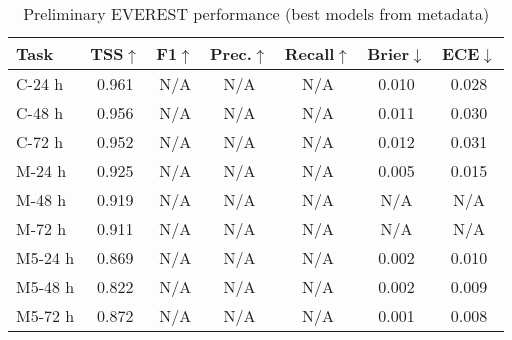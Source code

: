 
\begin{table}[ht]\centering
\caption{Preliminary EVEREST performance (best models from metadata)}
\label{tab:preliminary_results}
\begin{tabular}{lcccccc}
\toprule
\textbf{Task} & \textbf{TSS}$\uparrow$ & \textbf{F1}$\uparrow$ & \textbf{Prec.}$\uparrow$ & \textbf{Recall}$\uparrow$ & \textbf{Brier}$\downarrow$ & \textbf{ECE}$\downarrow$ \\
\midrule
C-24 h & 0.961 & N/A & N/A & N/A & 0.010 & 0.028 \\
C-48 h & 0.956 & N/A & N/A & N/A & 0.011 & 0.030 \\
C-72 h & 0.952 & N/A & N/A & N/A & 0.012 & 0.031 \\
M-24 h & 0.925 & N/A & N/A & N/A & 0.005 & 0.015 \\
M-48 h & 0.919 & N/A & N/A & N/A & N/A & N/A \\
M-72 h & 0.911 & N/A & N/A & N/A & N/A & N/A \\
M5-24 h & 0.869 & N/A & N/A & N/A & 0.002 & 0.010 \\
M5-48 h & 0.822 & N/A & N/A & N/A & 0.002 & 0.009 \\
M5-72 h & 0.872 & N/A & N/A & N/A & 0.001 & 0.008 \\
\bottomrule
\end{tabular}
\end{table}
